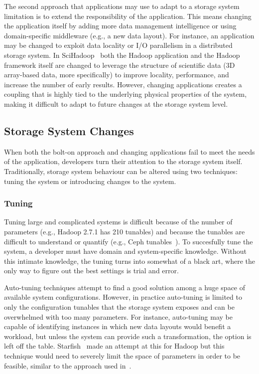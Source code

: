 \documentclass[10pt,twocolumn]{article}
\begin{document}
The second approach that applications may use to adapt to a storage system
limitation is to extend the responsibility of the application. This means
changing the application itself by adding more data management intelligence or
using domain-specific middleware (e.g., a new data layout). For instance, an
application may be changed to exploit data locality or I/O parallelism in a
distributed storage system.
In SciHadoop~\cite{buck:hpc2011-scihadoop,buck:sc2013-scidr} both the Hadoop
application and the Hadoop framework itself are changed to leverage the structure of
scientific data (3D array-based data, more specifically) to
improve locality, performance, and increase the number of early results. %
However, changing applications creates a coupling that is highly tied to the
underlying physical properties of the system, making it difficult to
adapt to future changes at the storage system level.

\subsection{Storage System Changes}\label{storage-changes}

When both the bolt-on approach and changing applications fail to meet the needs of the application,
developers turn their attention to the storage system itself.
Traditionally, storage system behaviour can be altered using two
techniques: tuning the system or introducing changes to the system.

\subsubsection{Tuning}\label{tuning}

Tuning large and complicated systems is difficult because of the number
of parameters (e.g., Hadoop 2.7.1 has 210 tunables) and because the
tunables are difficult to understand or quantify (e.g., Ceph tunables~\cite{sevilla:sc15-mantle}). To succesfully tune the system, a
developer must have domain and system-specific knowledge. Without this
intimate knowledge, the tuning turns into somewhat of a black art, where
the only way to figure out the best settings is trial and error.

Auto-tuning techniques attempt to find a good solution among a huge space of
available system configurations. However, in practice auto-tuning is limited
to only the configuration tunables that the storage system exposes and can be
overwhelmed with too many parameters.  For instance, auto-tuning may be
capable of identifying instances in which new data layouts would benefit a
workload, but unless the system can provide such a transformation, the option
is left off the table.  Starfish~\cite{herodotou:cidr2011-starfish} made
an attempt at this for Hadoop but this technique would need to severely limit
the space of parameters in order to be feasible, similar to the approach used in~\cite{behzad:sc2013-autotuning}.
\end{document}
